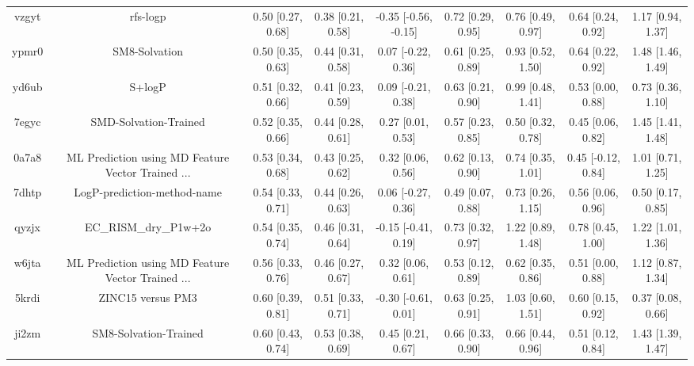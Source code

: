 \documentclass{article}
\begin{document}
\begin{center}
\begin{longtable}{|ccccccccc|}
 vzgyt &                                           rfs-logp &  0.50 [0.27, 0.68] &  0.38 [0.21, 0.58] &  -0.35 [-0.56, -0.15] &  0.72 [0.29, 0.95] &    0.76 [0.49, 0.97] &    0.64 [0.24, 0.92] &     1.17 [0.94, 1.37] \\
 ypmr0 &                                      SM8-Solvation &  0.50 [0.35, 0.63] &  0.44 [0.31, 0.58] &    0.07 [-0.22, 0.36] &  0.61 [0.25, 0.89] &    0.93 [0.52, 1.50] &    0.64 [0.22, 0.92] &     1.48 [1.46, 1.49] \\
 yd6ub &                                             S+logP &  0.51 [0.32, 0.66] &  0.41 [0.23, 0.59] &    0.09 [-0.21, 0.38] &  0.63 [0.21, 0.90] &    0.99 [0.48, 1.41] &    0.53 [0.00, 0.88] &     0.73 [0.36, 1.10] \\
 7egyc &                              SMD-Solvation-Trained &  0.52 [0.35, 0.66] &  0.44 [0.28, 0.61] &     0.27 [0.01, 0.53] &  0.57 [0.23, 0.85] &    0.50 [0.32, 0.78] &    0.45 [0.06, 0.82] &     1.45 [1.41, 1.48] \\
 0a7a8 &  ML Prediction using MD Feature Vector Trained ... &  0.53 [0.34, 0.68] &  0.43 [0.25, 0.62] &     0.32 [0.06, 0.56] &  0.62 [0.13, 0.90] &    0.74 [0.35, 1.01] &   0.45 [-0.12, 0.84] &     1.01 [0.71, 1.25] \\
 7dhtp &                        LogP-prediction-method-name &  0.54 [0.33, 0.71] &  0.44 [0.26, 0.63] &    0.06 [-0.27, 0.36] &  0.49 [0.07, 0.88] &    0.73 [0.26, 1.15] &    0.56 [0.06, 0.96] &     0.50 [0.17, 0.85] \\
 qyzjx &                              EC\_RISM\_dry\_P1w+2o &  0.54 [0.35, 0.74] &  0.46 [0.31, 0.64] &   -0.15 [-0.41, 0.19] &  0.73 [0.32, 0.97] &    1.22 [0.89, 1.48] &    0.78 [0.45, 1.00] &     1.22 [1.01, 1.36] \\
 w6jta &  ML Prediction using MD Feature Vector Trained ... &  0.56 [0.33, 0.76] &  0.46 [0.27, 0.67] &     0.32 [0.06, 0.61] &  0.53 [0.12, 0.89] &    0.62 [0.35, 0.86] &    0.51 [0.00, 0.88] &     1.12 [0.87, 1.34] \\
 5krdi &                                  ZINC15 versus PM3 &  0.60 [0.39, 0.81] &  0.51 [0.33, 0.71] &   -0.30 [-0.61, 0.01] &  0.63 [0.25, 0.91] &    1.03 [0.60, 1.51] &    0.60 [0.15, 0.92] &     0.37 [0.08, 0.66] \\
 ji2zm &                              SM8-Solvation-Trained &  0.60 [0.43, 0.74] &  0.53 [0.38, 0.69] &     0.45 [0.21, 0.67] &  0.66 [0.33, 0.90] &    0.66 [0.44, 0.96] &    0.51 [0.12, 0.84] &     1.43 [1.39, 1.47] \\

\end{longtable}
\end{center}
\end{document}
